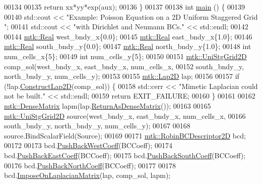 \begin{DoxyCode}
00134 
00135   \textcolor{keywordflow}{return} xx*yy*exp(aux);
00136 \}
00137 
00138 \textcolor{keywordtype}{int} \hyperlink{poisson__2d_8cc_ae66f6b31b5ad750f1fe042a706a4e3d4}{main} () \{
00139 
00140   std::cout << \textcolor{stringliteral}{"Example: Poisson Equation on a 2D Uniform Staggered Grid "};
00141   std::cout << \textcolor{stringliteral}{"with Dirichlet and Neumann BCs."} << std::endl;
00142 
00144   \hyperlink{group__c01-roots_gac080bbbf5cbb5502c9f00405f894857d}{mtk::Real} west\_bndy\_x\{0.0\};
00145   \hyperlink{group__c01-roots_gac080bbbf5cbb5502c9f00405f894857d}{mtk::Real} east\_bndy\_x\{1.0\};
00146   \hyperlink{group__c01-roots_gac080bbbf5cbb5502c9f00405f894857d}{mtk::Real} south\_bndy\_y\{0.0\};
00147   \hyperlink{group__c01-roots_gac080bbbf5cbb5502c9f00405f894857d}{mtk::Real} north\_bndy\_y\{1.0\};
00148   \textcolor{keywordtype}{int} num\_cells\_x\{5\};
00149   \textcolor{keywordtype}{int} num\_cells\_y\{5\};
00150 
00151   \hyperlink{classmtk_1_1UniStgGrid2D}{mtk::UniStgGrid2D} comp\_sol(west\_bndy\_x, east\_bndy\_x, num\_cells\_x,
00152                              south\_bndy\_y, north\_bndy\_y, num\_cells\_y);
00153 
00155   \hyperlink{classmtk_1_1Lap2D}{mtk::Lap2D} lap;
00156 
00157   \textcolor{keywordflow}{if} (!lap.\hyperlink{classmtk_1_1Lap2D_a188ee8fee643463affca7de2884711b1}{ConstructLap2D}(comp\_sol)) \{
00158     std::cerr << \textcolor{stringliteral}{"Mimetic Laplacian could not be built."} << std::endl;
00159     \textcolor{keywordflow}{return} EXIT\_FAILURE;
00160   \}
00161 
00162   \hyperlink{classmtk_1_1DenseMatrix}{mtk::DenseMatrix} lapm(lap.\hyperlink{classmtk_1_1Lap2D_aaac0a22eaa2f036869b24fd420ce5761}{ReturnAsDenseMatrix}());
00163 
00165   \hyperlink{classmtk_1_1UniStgGrid2D}{mtk::UniStgGrid2D} source(west\_bndy\_x, east\_bndy\_x, num\_cells\_x,
00166                            south\_bndy\_y, north\_bndy\_y, num\_cells\_y);
00167 
00168   source.BindScalarField(Source);
00169 
00171   \hyperlink{classmtk_1_1RobinBCDescriptor2D}{mtk::RobinBCDescriptor2D} bcd;
00172 
00173   bcd.\hyperlink{classmtk_1_1RobinBCDescriptor2D_a671a38d5ea78be8f0a88ccf034d09987}{PushBackWestCoeff}(BCCoeff);
00174   bcd.\hyperlink{classmtk_1_1RobinBCDescriptor2D_a7cc1e6ca729b8b092eb73161eb244160}{PushBackEastCoeff}(BCCoeff);
00175   bcd.\hyperlink{classmtk_1_1RobinBCDescriptor2D_ad74c5d9f2c1d0359d350348ac2a7e61e}{PushBackSouthCoeff}(BCCoeff);
00176   bcd.\hyperlink{classmtk_1_1RobinBCDescriptor2D_abc6e299516af5d1c5c2d04797875b446}{PushBackNorthCoeff}(BCCoeff);
00177 
00178   bcd.\hyperlink{classmtk_1_1RobinBCDescriptor2D_a0a26693f5265fcad978e7ba84e01ed69}{ImposeOnLaplacianMatrix}(lap, comp\_sol, lapm);

\end{DoxyCode}
